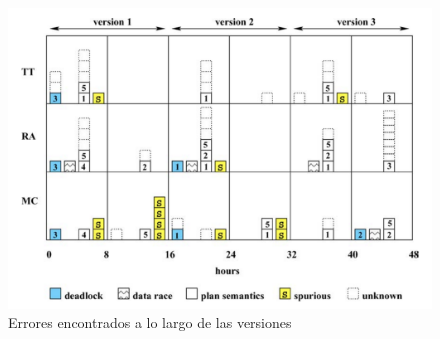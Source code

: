 \documentclass[runningheads]{llncs}
\begin{document}
\begin{figure}[H]
\includegraphics[scale=0.5]{fig3.png}
\caption{Errores encontrados a lo largo de las versiones} \label{fig3}
\end{figure}
\end{document}
